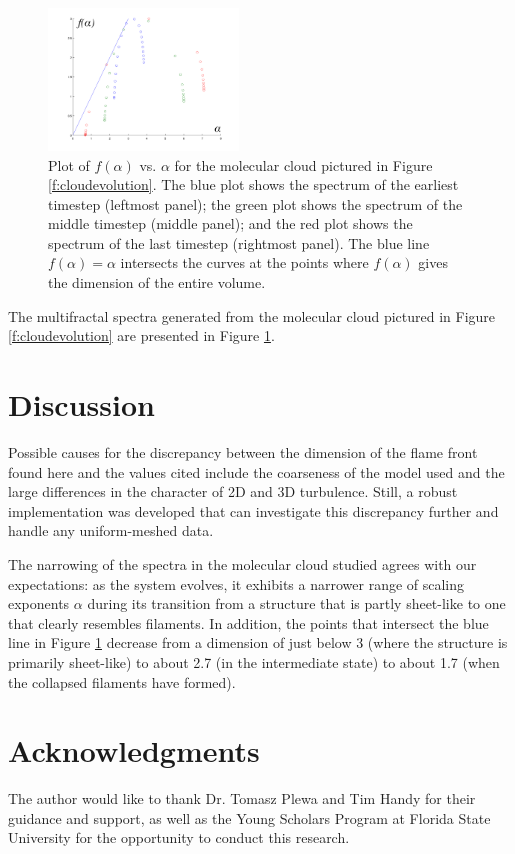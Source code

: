 \documentclass[iop]{emulateapj}
\begin{document}
\begin{figure}
\begin{center}
\includegraphics[width=0.45\textwidth,clip=true]{Graphics/falphaclouds.png}
\caption{Plot of $f(\alpha)$ vs. $\alpha$ for the molecular cloud pictured in Figure \ref{f:cloudevolution}. The blue plot shows the spectrum of the earliest timestep (leftmost panel); the green plot shows the spectrum of the middle timestep (middle panel); and the red plot shows the spectrum of the last timestep (rightmost panel). The blue line $f(\alpha) = \alpha $ intersects the curves at the points where $f(\alpha)$ gives the dimension of the entire volume.
\label{f:falphamultifractal}}
\end{center}
\end{figure} 

The multifractal spectra generated from the molecular cloud pictured in Figure \ref{f:cloudevolution} are presented in Figure \ref{f:falphamultifractal}.

\section{Discussion}\label{Discussion}
Possible causes for the discrepancy between the dimension of the flame front found here and the values cited include the coarseness of the model used and the large differences in the character of 2D and 3D turbulence. Still, a robust implementation was developed that can investigate this discrepancy further and handle any uniform-meshed data.
 
The narrowing of the spectra in the molecular cloud studied agrees with our expectations: as the system evolves, it exhibits a narrower range of scaling exponents $ \alpha $ during its transition from a structure that is partly sheet-like to one that clearly resembles filaments. In addition, the points that intersect the blue line in Figure \ref{f:falphamultifractal} decrease from a dimension of just below 3 (where the structure is primarily sheet-like) to about 2.7 (in the intermediate state) to about 1.7 (when the collapsed filaments have formed).

\section{Acknowledgments}\label{s:ack}
The author would like to thank Dr. Tomasz Plewa and Tim Handy for their guidance and support, as well as the Young Scholars Program at Florida State University for the opportunity to conduct this research.
%
%


%
%
%
\end{document}
